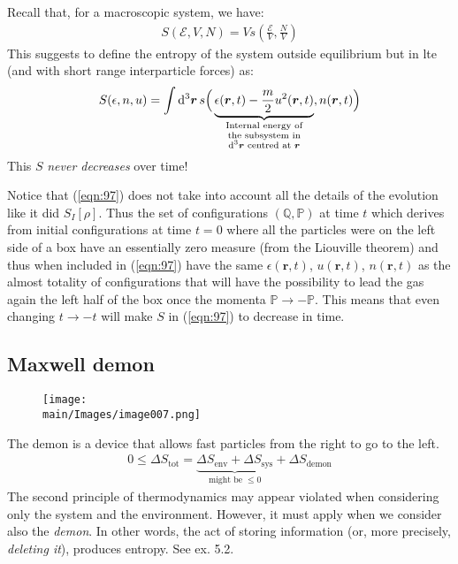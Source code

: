 \documentclass[../../main.tex]{subfiles}
\begin{document}
\medskip

Recall that, for a macroscopic system, we have:
\begin{align}\label{eqn:96}
    S(\mathcal{E}, V, N) = V s\left(\frac{\mathcal{E}}{V}, \frac{N}{V}  \right)
\end{align}
This suggests to define the entropy of the system outside equilibrium but in lte (and with short range interparticle forces) as:
\begin{align}\label{eqn:97}
    S(\epsilon, n, u) = \int \dd[3]{\bm{r}} s\Big(\underbrace{\epsilon(\bm{r},t) - \frac{m}{2} u^2(\bm{r},t)}_{\parbox{7em}{\centering\scriptsize Internal energy of the subsystem in $\dd[3]{\bm{r}}$ centred at $\bm{r}$}} , n(\bm{r},t) \Big)
\end{align}
This $S$ \textit{never decreases} over time!

Notice that (\ref{eqn:97}) does not take into account all the details of the evolution like it did $S_I[\rho]$. Thus the set of configurations $(\mathbb{Q}, \mathbb{P})$ at time $t$ which derives from initial configurations at time $t=0$ where all the particles were on the left side of a box have an essentially zero measure (from the Liouville theorem) and thus when included in (\ref{eqn:97}) have the same $\epsilon(\bm{r},t)$, $u(\bm{r},t)$, $n(\bm{r},t)$ as the almost totality of configurations that will  have the possibility to lead the gas again the left half of the box once the momenta $\mathbb{P} \to -\mathbb{P}$. This means that even changing $t \to -t$ will make $S$ in (\ref{eqn:97}) to decrease in time.

\subsection{Maxwell demon}

\begin{figure}[H]
    \centering
    \texttt{[image: \\main/Images/image007.png]}
    \caption{\label{fig:maxwell}}
\end{figure}

The demon is a device that allows fast particles from the right to go to the left. 
\begin{align*}
    0 \leq \Delta S_{\mathrm{tot}} = \underbrace{\Delta S_{\mathrm{env}} + \Delta S_{\mathrm{sys} }}_{\text{might be $\leq 0$}}  + \Delta S_{\mathrm{demon}}
\end{align*}
The second principle of thermodynamics may appear violated when considering only the system and the environment. However, it must apply when we consider also the \textit{demon}. In other words, the act of storing information (or, more precisely, \textit{deleting it}), produces entropy. 
See ex. 5.2.
\end{document}
